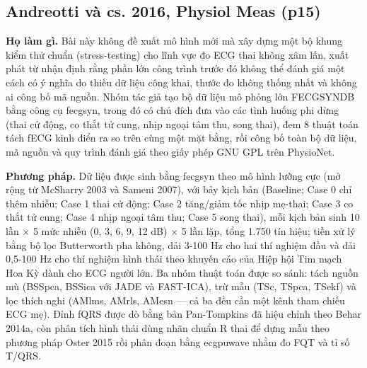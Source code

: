 \documentclass[12pt,a4paper]{article}
\begin{document}
\subsection{Andreotti và cs. 2016, Physiol Meas \normalfont\small (p15)}
\par\vspace{2pt}
\par\vspace{4pt}
\noindent \textbf{Họ làm gì.} Bài này không đề xuất mô hình mới mà xây dựng một bộ khung kiểm thử chuẩn (stress-testing) cho lĩnh vực đo ECG thai không xâm lấn, xuất phát từ nhận định rằng phần lớn công trình trước đó không thể đánh giá một cách có ý nghĩa do thiếu dữ liệu công khai, thước đo không thống nhất và không ai công bố mã nguồn. Nhóm tác giả tạo bộ dữ liệu mô phỏng lớn FECGSYNDB bằng công cụ fecgsyn, trong đó có chủ đích đưa vào các tình huống phi dừng (thai cử động, co thắt tử cung, nhịp ngoại tâm thu, song thai), đem 8 thuật toán tách fECG kinh điển ra so trên cùng một mặt bằng, rồi công bố toàn bộ dữ liệu, mã nguồn và quy trình đánh giá theo giấy phép GNU GPL trên PhysioNet.\par\vspace{3pt}
\noindent \textbf{Phương pháp.} Dữ liệu được sinh bằng fecgsyn theo mô hình lưỡng cực (mở rộng từ McSharry 2003 và Sameni 2007), với bảy kịch bản (Baseline; Case 0 chỉ thêm nhiễu; Case 1 thai cử động; Case 2 tăng/giảm tốc nhịp mẹ-thai; Case 3 co thắt tử cung; Case 4 nhịp ngoại tâm thu; Case 5 song thai), mỗi kịch bản sinh 10 lần × 5 mức nhiễu (0, 3, 6, 9, 12 dB) × 5 lần lặp, tổng 1.750 tín hiệu; tiền xử lý bằng bộ lọc Butterworth pha không, dải 3-100 Hz cho hai thí nghiệm đầu và dải 0,5-100 Hz cho thí nghiệm hình thái theo khuyến cáo của Hiệp hội Tim mạch Hoa Kỳ dành cho ECG người lớn. Ba nhóm thuật toán được so sánh: tách nguồn mù (BSSpca, BSSica với JADE và FAST-ICA), trừ mẫu (TSc, TSpca, TSekf) và lọc thích nghi (AMlms, AMrls, AMesn — cả ba đều cần một kênh tham chiếu ECG mẹ). Đỉnh fQRS được dò bằng bản Pan-Tompkins đã hiệu chỉnh theo Behar 2014a, còn phân tích hình thái dùng nhãn chuẩn R thai để dựng mẫu theo phương pháp Oster 2015 rồi phân đoạn bằng ecgpuwave nhằm đo FQT và tỉ số T/QRS.\par\vspace{3pt}
\end{document}
